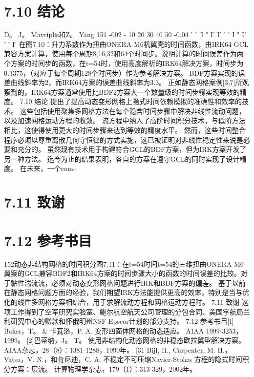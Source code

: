 \documentclass[UTF8,11pt,a4paper,openany,fontset=fandol]{ctexbook}
\begin{document}
\section{7.10 结论}
D。 J。 Mavriplis和Z。 Yang 151 -002 - 10 20 30 40 50 -0.04 ' ' 'I " I' I' ' ' I " I' ' ' I' 在图7.10：升力系数作为扭曲ONERA M6机翼壳的时间函数，由IRK64 GCL兼容方案计算，使用每个周期8,16,32和64个时间步。说明计算的时间误差作为两个方案的时间步的函数，在t=54时，使用高度解析的IRK64解决方案，时间步为0.3375，（对应于每个周期128个时间步）作为参考解决方案。 BDF方案实现的误差曲线斜率为2，而IRK64方案的误差曲线斜率为3.3。 正如静态网格案例[3,7]所观察到的，IRK64方案通常使用比BDF2方案大一个数量级的时间步骤实现等效的精度。 7.10 结论 提出了提高动态变形网格上隐式时间依赖模拟的准确性和效率的技术。 这些包括使用聚集多网格方法在每个隐含时间步骤中解决非线性流动问题，以及加速网格运动方程的收敛。 流方程中纳入了高阶时间积分技术，与低阶方法相比，这使得使用更大的时间步骤来达到等效的精度水平。 然而，这些时间整合程序必须以尊重离散几何守恒律的方式实施，这已被证明对非线性稳定性来说是必要和充分的。 虽然现有技术用于构建符合GCL的BDF方案，但为IRK方案开发了另一种方法。 迄今为止的结果表明，各自的方案在遵守GCL的同时实现了设计精度。 在未来，一个com-

\section{7.11 致谢}
\section{7.12 参考书目}
152动态非结构网格的时间积分图7.11：在t=54时间t=54的三维扭曲ONERA M6翼案的GCL兼容BDF2和IRK64方案的时间步骤大小的函数的时间误差的比较。对于黏性湍流流，必须对动态变形网格问题进行IRK和BDF方案的偏差。 基于以前在静态网格问题方面的经验，我们期望IRK方法能提供更高的效率，特别是当与优化的线性多网格方案相结合，用于求解流动方程和网格运动方程时。 7.11 致谢 这项工作得到了空军研究实验室、鲍尔航空航天公司管理的分包合同、美国宇航局兰利研究中心的赠款和怀俄明州NSF Epscor计划的部分支持。 7.12 参考书目[I] Baker，T。 \& 卡瓦洛，P. A. 变形四面体网格的动态适应。 AIAA 1999-3253，1999。 [2]巴蒂纳，J。 T。 使用非结构化动态网格的非稳态欧拉翼型解决方案。 AIAA杂志，28（8）：1381-1288，1990年。 [31 Bijl, H., Carpenter, M. H.，Vatsa，V. N.，和肯尼迪，C. A. 不稳定不可压缩Navier-Stokes 方程的隐式时间积分方案：层流。 计算物理学杂志，179（1）：313-329，2002年。
\end{document}
